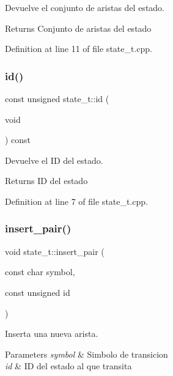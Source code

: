 Devuelve el conjunto de aristas del estado. 

\begin{DoxyReturn}{Returns}
Conjunto de aristas del estado 
\end{DoxyReturn}


Definition at line 11 of file state\+\_\+t.\+cpp.

\mbox{\label{classstate__t_ade808c541a78e337c021020842e3c21d}} 
\subsubsection{\texorpdfstring{id()}{id()}}
{\footnotesize\ttfamily const unsigned state\+\_\+t\+::id (\begin{DoxyParamCaption}\item[{void}]{ }\end{DoxyParamCaption}) const}



Devuelve el ID del estado. 

\begin{DoxyReturn}{Returns}
ID del estado 
\end{DoxyReturn}


Definition at line 7 of file state\+\_\+t.\+cpp.

\mbox{\label{classstate__t_a8a18ea542fd131b22dfee5897caab79e}} 
\subsubsection{\texorpdfstring{insert\+\_\+pair()}{insert\_pair()}}
{\footnotesize\ttfamily void state\+\_\+t\+::insert\+\_\+pair (\begin{DoxyParamCaption}\item[{const char}]{symbol,  }\item[{const unsigned}]{id }\end{DoxyParamCaption})}



Inserta una nueva arista. 


\begin{DoxyParams}{Parameters}
{\em symbol} & Simbolo de transicion \\
\hline
{\em id} & ID del estado al que transita \\
\hline
\end{DoxyParams}


